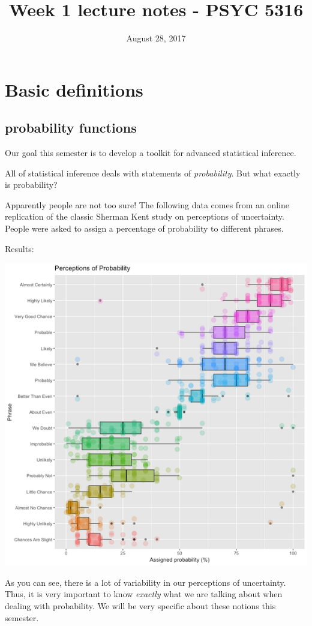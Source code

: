\documentclass[11pt]{article}
\date{August 28, 2017}
\title{Week 1 lecture notes - PSYC 5316}
\begin{document}
\maketitle

\section*{Basic definitions}
\label{sec-1}
\subsection*{probability functions}
\label{sec-1-1}
Our goal this semester is to develop a toolkit for advanced statistical inference.

All of statistical inference deals with statements of \emph{probability}.  But what exactly is probability?

Apparently people are not too sure!  The following data comes from an online replication of the classic Sherman Kent study on perceptions of uncertainty.  People were asked to assign a percentage of probability to different phrases.

Results:

\includegraphics[width=.9\linewidth]{figures/probPlot.png}

As you can see, there is a lot of variability in our perceptions of uncertainty.  Thus, it is very important to know \emph{exactly} what we are talking about when dealing with probability.  We will be very specific about these notions this semester.
\end{document}
